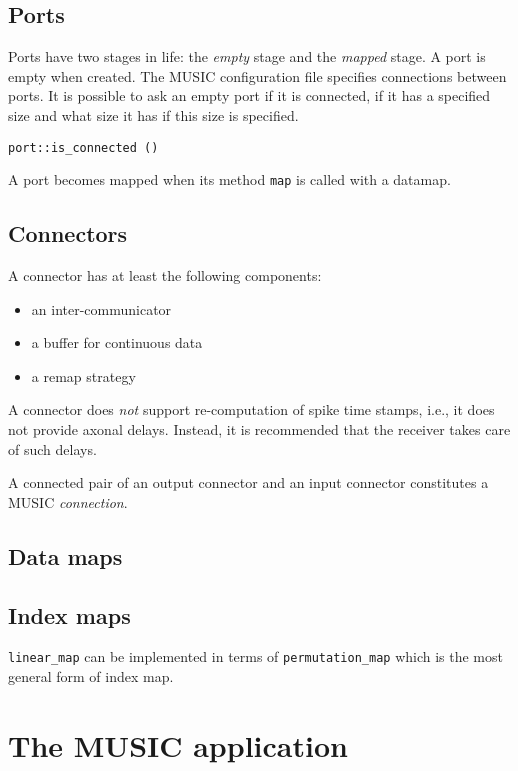 \documentclass[a4paper]{report}
\begin{document}
\subsection{Ports}

Ports have two stages in life: the \emph{empty} stage and the
\emph{mapped} stage.  A port is empty when created.  The MUSIC
configuration file specifies connections between ports.  It is
possible to ask an empty port if it is connected, if it has a
specified size and what size it has if this size is specified.

\verb|port::is_connected ()|

A port becomes mapped when its method \verb|map| is called with a
datamap.

\subsection{Connectors}

A connector has at least the following components:
\begin{itemize}
  \item an inter-communicator
  \item a buffer for continuous data
  \item a remap strategy
\end{itemize}

A connector does \emph{not} support re-computation of spike time
stamps, i.e., it does not provide axonal delays.  Instead, it is
recommended that the receiver takes care of such delays.

A connected pair of an output connector and an input connector
constitutes a MUSIC \emph{connection}.

\subsection{Data maps}

\subsection{Index maps}

\verb|linear_map| can be implemented in terms of
\verb|permutation_map| which is the most general form of index map.

\section{The MUSIC application}
\end{document}
